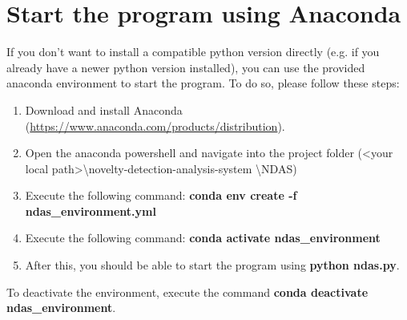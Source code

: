 \section{Start the program using Anaconda}\label{conda}
If you don't want to install a compatible python version directly (e.g. if you already have a newer python version installed), you can use the provided anaconda environment to start the program. To do so, please follow these steps: 
\begin{enumerate}
\item Download and install Anaconda (\url{https://www.anaconda.com/products/distribution}).
\item Open the anaconda powershell and navigate into the project folder (<your local path>\textbackslash novelty-detection-analysis-system \textbackslash NDAS)
\item Execute the following command: \textbf{conda env create -f ndas\_environment.yml}
\item Execute the following command: \textbf{conda activate ndas\_environment}
\item After this, you should be able to start the program using \textbf{python ndas.py}.
\end{enumerate}

To deactivate the environment, execute the command \textbf{conda deactivate ndas\_environment}.